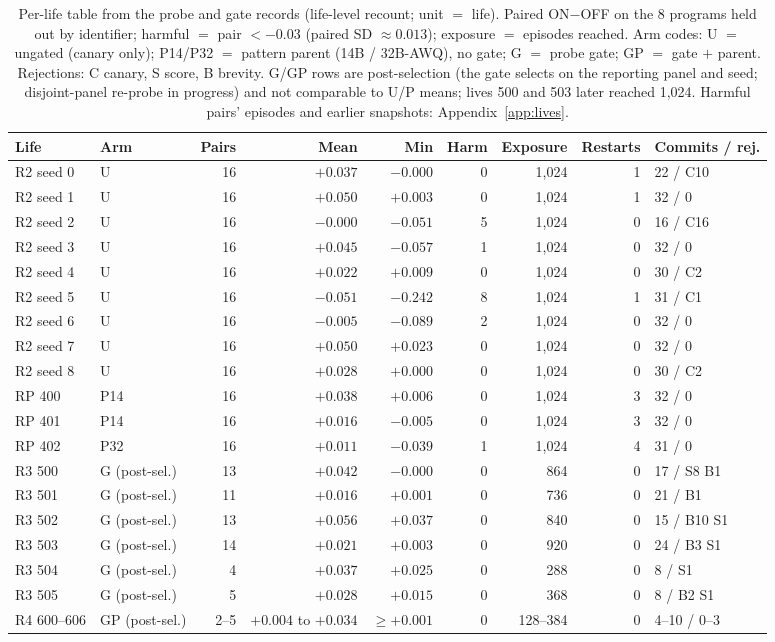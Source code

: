 \documentclass{article}
\newcommand{\onoff}{ON$-$OFF}
\begin{document}
\begin{table}[t]
\centering
\footnotesize
\setlength{\tabcolsep}{3.5pt}
\caption{Per-life table from the probe and gate records (life-level recount; unit $=$ life). Paired \onoff{} on the 8 programs held out by identifier; harmful $=$ pair $< -0.03$ (paired SD $\approx 0.013$); exposure $=$ episodes reached. Arm codes: U $=$ ungated (canary only); P14/P32 $=$ pattern parent (14B / 32B-AWQ), no gate; G $=$ probe gate; GP $=$ gate $+$ parent. Rejections: C canary, S score, B brevity. G/GP rows are post-selection (the gate selects on the reporting panel and seed; disjoint-panel re-probe in progress) and not comparable to U/P means; lives 500 and 503 later reached 1{,}024. Harmful pairs' episodes and earlier snapshots: Appendix~\ref{app:lives}.}
\label{tab:perlife}
\begin{tabular}{llrrrrrrl}
\toprule
Life & Arm & Pairs & Mean & Min & Harm & Exposure & Restarts & Commits / rej. \\
\midrule
R2 seed 0 & U & 16 & $+0.037$ & $-0.000$ & 0 & 1{,}024 & 1 & 22 / C10 \\
R2 seed 1 & U & 16 & $+0.050$ & $+0.003$ & 0 & 1{,}024 & 1 & 32 / 0 \\
R2 seed 2 & U & 16 & $-0.000$ & $-0.051$ & 5 & 1{,}024 & 0 & 16 / C16 \\
R2 seed 3 & U & 16 & $+0.045$ & $-0.057$ & 1 & 1{,}024 & 0 & 32 / 0 \\
R2 seed 4 & U & 16 & $+0.022$ & $+0.009$ & 0 & 1{,}024 & 0 & 30 / C2 \\
R2 seed 5 & U & 16 & $-0.051$ & $-0.242$ & 8 & 1{,}024 & 1 & 31 / C1 \\
R2 seed 6 & U & 16 & $-0.005$ & $-0.089$ & 2 & 1{,}024 & 0 & 32 / 0 \\
R2 seed 7 & U & 16 & $+0.050$ & $+0.023$ & 0 & 1{,}024 & 0 & 32 / 0 \\
R2 seed 8 & U & 16 & $+0.028$ & $+0.000$ & 0 & 1{,}024 & 0 & 30 / C2 \\
RP 400 & P14 & 16 & $+0.038$ & $+0.006$ & 0 & 1{,}024 & 3 & 32 / 0 \\
RP 401 & P14 & 16 & $+0.016$ & $-0.005$ & 0 & 1{,}024 & 3 & 32 / 0 \\
RP 402 & P32 & 16 & $+0.011$ & $-0.039$ & 1 & 1{,}024 & 4 & 31 / 0 \\
\midrule
R3 500 & G (post-sel.) & 13 & $+0.042$ & $-0.000$ & 0 & 864 & 0 & 17 / S8 B1 \\
R3 501 & G (post-sel.) & 11 & $+0.016$ & $+0.001$ & 0 & 736 & 0 & 21 / B1 \\
R3 502 & G (post-sel.) & 13 & $+0.056$ & $+0.037$ & 0 & 840 & 0 & 15 / B10 S1 \\
R3 503 & G (post-sel.) & 14 & $+0.021$ & $+0.003$ & 0 & 920 & 0 & 24 / B3 S1 \\
R3 504 & G (post-sel.) & 4 & $+0.037$ & $+0.025$ & 0 & 288 & 0 & 8 / S1 \\
R3 505 & G (post-sel.) & 5 & $+0.028$ & $+0.015$ & 0 & 368 & 0 & 8 / B2 S1 \\
R4 600--606 & GP (post-sel.) & 2--5 & $+0.004$ to $+0.034$ & $\ge +0.001$ & 0 & 128--384 & 0 & 4--10 / 0--3 \\
\bottomrule
\end{tabular}
\end{table}
\end{document}
